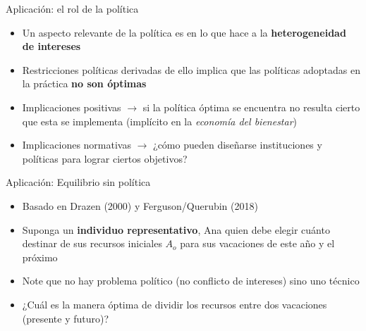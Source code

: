 \documentclass[14pt,aspectratio=169]{beamer}
\begin{document}
\begin{frame}{Aplicación: el rol de la política}
  \begin{itemize}
    \item Un aspecto relevante de la política es en lo que hace a la \textbf{heterogeneidad de
        intereses}
      \item Restricciones políticas derivadas de ello implica que las políticas adoptadas en la práctica \textbf{no
          son óptimas}
        \item Implicaciones positivas $\longrightarrow$ si la política
          óptima se encuentra no resulta cierto que esta se implementa
          (implícito en la \textit{economía del bienestar})
          \item Implicaciones normativas $\longrightarrow$ ¿cómo
            pueden diseñarse instituciones y políticas para lograr
            ciertos objetivos?
            \end{itemize}

\end{frame}


\begin{frame}{Aplicación: Equilibrio sin política}
  \begin{itemize}
  \item Basado en Drazen (2000) y Ferguson/Querubin (2018)
    \item Suponga un \textbf{individuo representativo}, Ana quien debe elegir
      cuánto destinar de sus recursos iniciales $A_{o}$ para sus
      vacaciones de este año y el próximo
      \item  Note que no hay problema político (no conflicto
        de intereses) sino uno técnico
        \item ¿Cuál es la manera óptima de dividir los recursos entre
          dos vacaciones (presente y futuro)?
    
  \end{itemize}

\end{frame}
\end{document}

